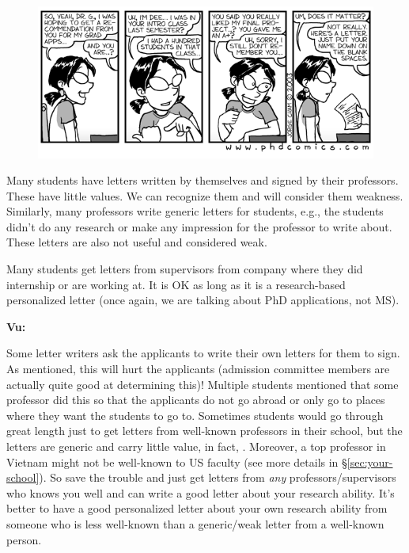 \documentclass[11pt]{article}
\newenvironment{commentbox}[1][]{
\small
    \begin{cbox}
    \textbf{#1} 
 }{
   \end{cbox}
}
\newcommand{\red}[1]{{\color{red}{#1}}}
\begin{document}
\begin{figure}
\vspace{-0.2in}
      \begin{center}
        \includegraphics[width=1\linewidth]{c6.png}
      \end{center}
      \vspace{-0.1in}
\end{figure}
Many students have letters written by themselves and signed by their professors. These have little
values. We can recognize them and will consider them weakness.
Similarly, many professors write generic letters for students, e.g., the students didn't do any
research or make any impression for the professor to write about. These letters are also not useful and considered weak.

Many students get letters from supervisors from company where they did internship or are
working at. It is OK as long as it is a research-based personalized
letter (once again, we are talking about PhD applications, not MS).

\begin{commentbox}[Vu:]
Some letter writers ask the applicants to write their own letters for them to sign. As mentioned, this will hurt the applicants (admission committee members are actually quite good at determining this)! Multiple students mentioned that  some professor did this so that the applicants do not go abroad or only go to places where they want the students to go to.
\tcblower
Sometimes students would go through great length just to get letters from well-known professors in their school, but the letters are generic and carry little value, in fact, \red{red flags}. Moreover, a top professor in Vietnam might not be well-known to US faculty (see more details in \S\ref{sec:your-school}). So save the trouble and just get letters from \emph{any} professors/supervisors who knows you well and can write a good letter about your research ability. It's better to have a good personalized
letter about your own research ability from someone who is less
well-known than a generic/weak letter from a well-known person.
\end{commentbox}
\end{document}
